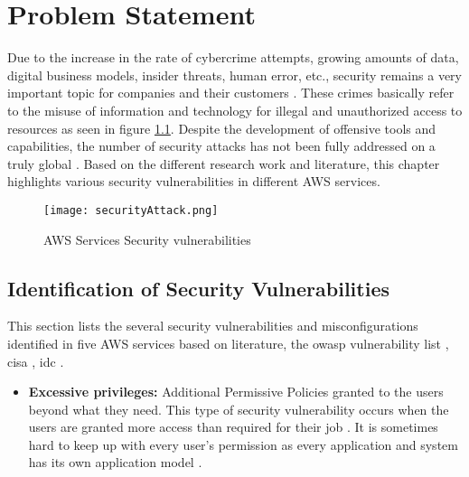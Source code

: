 
\chapter{Problem Statement}

\par Due to the increase in the rate of cybercrime attempts, growing amounts of data, digital business models, insider threats, human error, etc., security remains a very important topic for companies and their customers \cite{40}.
 These crimes basically refer to the misuse of information and technology for illegal and unauthorized access to resources as seen in figure \ref{fig:securityAttack}.
 Despite the development of offensive tools and
capabilities, the number of security attacks has not been
fully addressed on a truly global \cite{50}.
 Based on the different research work and literature, this chapter highlights various security vulnerabilities in different AWS services.

\begin{figure}
    \centering
    \texttt{[image: securityAttack.png]}
    \caption{AWS Services Security vulnerabilities}
    \label{fig:securityAttack}
\end{figure}

\section{Identification of Security Vulnerabilities}

\par This section lists the several security vulnerabilities and misconfigurations identified in five AWS services
based on literature, the \gls{owasp} vulnerability list
\cite{51},
\gls{cisa}
\cite{52}, \gls{idc} \cite{53}.


\begin{itemize}
    \item \textbf{Excessive privileges:} Additional Permissive Policies granted to the users beyond what they need.
    This type
    of security vulnerability occurs when the users are
    granted more access than required for their job
    \cite{54}. It is
    sometimes hard to keep up with every user’s permission as every application and system has its own application
    model \cite{55}.
\end{itemize}

